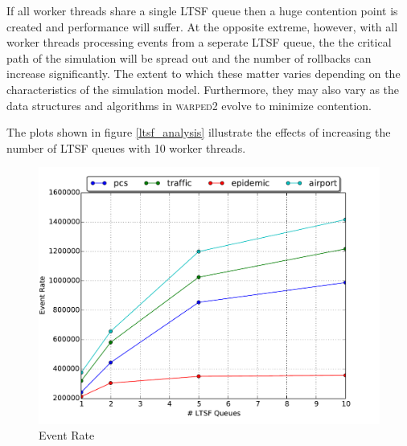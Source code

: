 \documentclass[11pt]{book}
\begin{document}
If all worker threads share a single LTSF queue then a huge contention point is created and
performance will suffer.  At the opposite extreme, however, with all worker threads processing
events from a seperate LTSF queue, the the critical path of the simulation will be spread out
and the number of rollbacks can increase significantly.  The extent to which these matter varies
depending on the characteristics of the simulation model.  Furthermore, they may also vary as
the data structures and algorithms in \textsc{warped2} evolve to minimize contention.

The plots shown in figure \ref{ltsf_analysis} illustrate the effects of increasing the number
of LTSF queues with 10 worker threads.

\begin{figure}
  \begin{minipage}{.5\textwidth}
    \begin{center}
      \includegraphics[width=\textwidth,keepaspectratio,quiet]{figs/pending_event_set/ltsf_event_rate.pdf} \\
      Event Rate \\
    \end{center}
  \end{minipage}%
  \hfill
  \begin{minipage}{.5\textwidth}
    \begin{center}

\end{center}
\end{minipage}
\end{figure}
\end{document}
